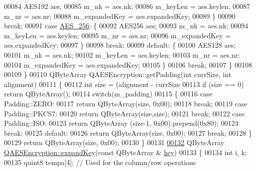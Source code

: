 \begin{DoxyCode}
00084         AES192 aes;
00085         m\_nk = aes.nk;
00086         m\_keyLen = aes.keylen;
00087         m\_nr = aes.nr;
00088         m\_expandedKey = aes.expandedKey;
00089         \}
00090         \textcolor{keywordflow}{break};
00091     \textcolor{keywordflow}{case} \hyperlink{class_q_a_e_s_encryption_abe48208f4f6c7d68e6a10b49b9d0b7bdacde97774ab1d4c609e04b0dd13a1e1f7}{AES\_256}: \{
00092         AES256 aes;
00093         m\_nk = aes.nk;
00094         m\_keyLen = aes.keylen;
00095         m\_nr = aes.nr;
00096         m\_expandedKey = aes.expandedKey;
00097         \}
00098         \textcolor{keywordflow}{break};
00099     \textcolor{keywordflow}{default}: \{
00100         AES128 aes;
00101         m\_nk = aes.nk;
00102         m\_keyLen = aes.keylen;
00103         m\_nr = aes.nr;
00104         m\_expandedKey = aes.expandedKey;
00105         \}
00106         \textcolor{keywordflow}{break};
00107     \}
00108 
00109 \}
00110 QByteArray QAESEncryption::getPadding(\textcolor{keywordtype}{int} currSize, \textcolor{keywordtype}{int} alignment)
00111 \{
00112     \textcolor{keywordtype}{int} size = (alignment - currSize %
00113     \textcolor{keywordflow}{if} (size == 0) \textcolor{keywordflow}{return} QByteArray();
00114     \textcolor{keywordflow}{switch}(m\_padding)
00115     \{
00116     \textcolor{keywordflow}{case} Padding::ZERO:
00117         \textcolor{keywordflow}{return} QByteArray(size, 0x00);
00118         \textcolor{keywordflow}{break};
00119     \textcolor{keywordflow}{case} Padding::PKCS7:
00120         \textcolor{keywordflow}{return} QByteArray(size,size);
00121         \textcolor{keywordflow}{break};
00122     \textcolor{keywordflow}{case} Padding::ISO:
00123         \textcolor{keywordflow}{return} QByteArray (size-1, 0x00).prepend(0x80);
00124         \textcolor{keywordflow}{break};
00125     \textcolor{keywordflow}{default}:
00126         \textcolor{keywordflow}{return} QByteArray(size, 0x00);
00127         \textcolor{keywordflow}{break};
00128     \}
00129     \textcolor{keywordflow}{return} QByteArray(size, 0x00);
00130 \}
00131 
\hypertarget{qaesencryption_8cpp_source.tex_l00132}{}\hyperlink{class_q_a_e_s_encryption_a5bfbb972f84a8376fceed648553c0912}{00132} QByteArray \hyperlink{class_q_a_e_s_encryption_a5bfbb972f84a8376fceed648553c0912}{QAESEncryption::expandKey}(\textcolor{keyword}{const} QByteArray &
      \hyperlink{namespace_errors_dict_setup_a09c268098d09ffb8e5504f30fa6d5dd9}{key})
00133 \{
00134   \textcolor{keywordtype}{int} i, k;
00135   quint8 tempa[4]; \textcolor{comment}{// Used for the column/row operations}

\end{DoxyCode}
